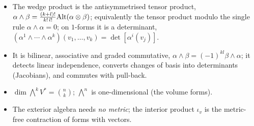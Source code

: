 \begin{keypoints}
\begin{itemize}
\item The wedge product is the antisymmetrised tensor product, $\alpha\wedge\beta=\frac{(k+l)!}{k!\,l!}\mathrm{Alt}(\alpha\otimes\beta)$; equivalently the tensor product modulo the single rule $\alpha\wedge\alpha=0$; on $1$-forms it is a determinant, $(\alpha^1\wedge\cdots\wedge\alpha^k)(v_1,\dots,v_k)=\det[\alpha^i(v_j)]$.
\item It is bilinear, associative and graded commutative, $\alpha\wedge\beta=(-1)^{kl}\beta\wedge\alpha$; it detects linear independence, converts changes of basis into determinants (Jacobians), and commutes with pull-back.
\item $\dim\bigwedge^kV^*=\binom nk$; $\bigwedge^n$ is one-dimensional (the volume forms).
\item The exterior algebra needs \emph{no metric}; the interior product $\iota_v$ is the metric-free contraction of forms with vectors.
\end{itemize}
\end{keypoints}
